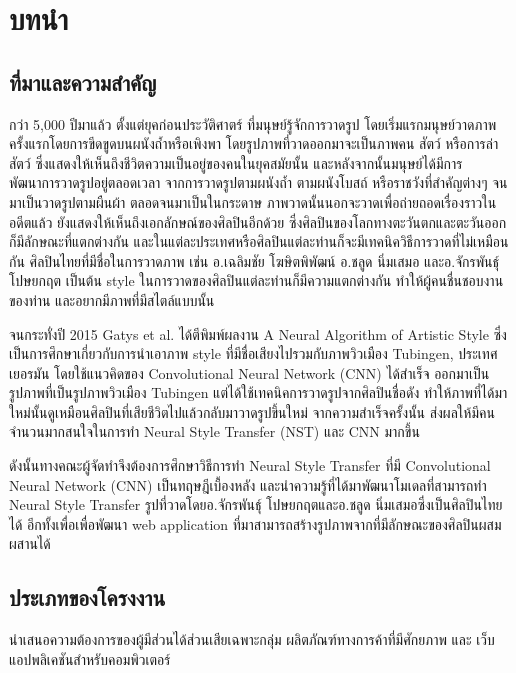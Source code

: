 \documentclass[12pt,oneside,openright,a4paper]{cpe-thai-project}
\begin{document}
\chapter{บทนำ}






\section{ที่มาและความสำคัญ}

\par\setlength{\parindent}{5ex}กว่า 5,000 ปีมาแล้ว ตั้งแต่ยุคก่อนประวัติศาตร์ ที่มนุษย์รู้จักการวาดรูป โดยเริ่มแรกมนุษย์วาดภาพครั้งแรกโดยการขีดขูดบนผนังถ้ำหรือเพิงพา โดยรูปภาพที่วาดออกมาจะเป็นภาพคน สัตว์ หรือการล่าสัตว์ ซึ่งแสดงให้เห็นถึงชีวิตความเป็นอยู่ของคนในยุคสมัยนั้น และหลังจากนั้นมนุษย์ได้มีการพัฒนาการวาดรูปอยู่ตลอดเวลา จากการวาดรูปตามผนังถ้ำ ตามผนังโบสถ์ หรือราชวังที่สำคัญต่างๆ จนมาเป็นวาดรูปตามผืนผ้า ตลอดจนมาเป็นในกระดาษ ภาพวาดนั้นนอกจะวาดเพื่อถ่ายถอดเรื่องราวในอดีตแล้ว ยังแสดงให้เห็นถึงเอกลักษณ์ของศิลปินอีกด้วย ซึ่งศิลปินของโลกทางตะวันตกและตะวันออกก็มีลักษณะที่แตกต่างกัน และในแต่ละประเทศหรือศิลปินแต่ละท่านก็จะมีเทคนิควิธีการวาดที่ไม่เหมือนกัน ศิลปินไทยที่มีชื่อในการวาดภาพ เช่น อ.เฉลิมชัย โฆษิตพิพัฒน์ อ.ชลูด นิ่มเสมอ และอ.จักรพันธุ์ โปษยกฤต เป็นต้น style ในการวาดของศิลปินแต่ละท่านก็มีความแตกต่างกัน ทำให้ผู้คนชื่นชอบงานของท่าน และอยากมีภาพที่มีสไตล์แบบนั้น 
\par\setlength{\parindent}{5ex}จนกระทั่งปี 2015 Gatys et al. ได้ตีพิมพ์ผลงาน A Neural Algorithm of Artistic Style ซึ่งเป็นการศึกษาเกี่ยวกับการนำเอาภาพ style ที่มีชื่อเสียงไปรวมกับภาพวิวเมือง Tubingen, ประเทศเยอรมัน โดยใช้แนวคิดของ Convolutional Neural Network (CNN)  ได้สำเร็จ ออกมาเป็นรูปภาพที่เป็นรูปภาพวิวเมือง Tubingen แต่ได้ใช้เทคนิคการวาดรูปจากศิลปินชื่อดัง ทำให้ภาพที่ได้มาใหม่นั้นดูเหมือนศิลปินที่เสียชีวิตไปแล้วกลับมาวาดรูปขึ้นใหม่ จากความสำเร็จครั้งนั้น ส่งผลให้มีคนจำนวนมากสนใจในการทำ Neural Style Transfer (NST) และ CNN มากขึ้น
\par\setlength{\parindent}{5ex}ดังนั้นทางคณะผู้จัดทำจึงต้องการศึกษาวิธีการทำ Neural Style Transfer ที่มี Convolutional Neural Network (CNN) เป็นทฤษฎีเบื้องหลัง และนำความรู้ที่ได้มาพัฒนาโมเดลที่สามารถทำ Neural Style Transfer รูปที่วาดโดยอ.จักรพันธุ์ โปษยกฤตและอ.ชลูด นิ่มเสมอซึ่งเป็นศิลปินไทยได้ อีกทั้งเพื่อเพื่อพัฒนา web application ที่มาสามารถสร้างรูปภาพจากที่มีลักษณะของศิลปินผสมผสานได้

\section{ประเภทของโครงงาน}
\par\setlength{\parindent}{5ex}นําเสนอความต้องการของผู้มีส่วนได้ส่วนเสียเฉพาะกลุ่ม ผลิตภัณฑ์ทางการค้าที่มีศักยภาพ และ เว็บแอปพลิเคชันสำหรับคอมพิวเตอร์
\end{document}
